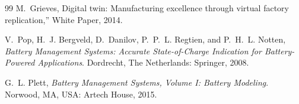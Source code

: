 \begin{thebibliography}{99}
M.~Grieves, Digital twin: Manufacturing excellence through virtual factory replication,'' White Paper, 2014.

V.~Pop, H.~J. Bergveld, D.~Danilov, P.~P.~L. Regtien, and P.~H.~L. Notten, \emph{Battery Management Systems: Accurate State-of-Charge Indication for Battery-Powered Applications}. Dordrecht, The Netherlands: Springer, 2008.

G.~L. Plett, \emph{Battery Management Systems, Volume I: Battery Modeling}. Norwood, MA, USA: Artech House, 2015.

\end{thebibliography}
